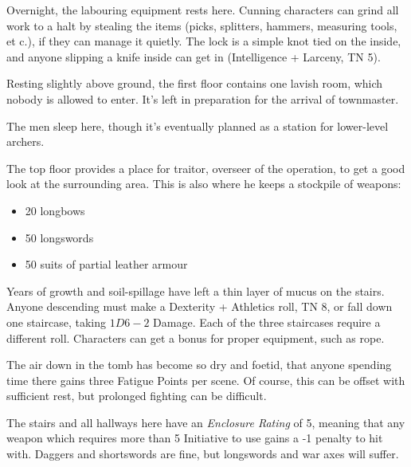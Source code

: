 \begin{multicols}{2}

Overnight, the labouring equipment rests here.  Cunning characters can grind all work to a halt by stealing the items (picks, splitters, hammers, measuring tools, et c.), if they can manage it quietly.  The lock is a simple knot tied on the inside, and anyone slipping a knife inside can get in (Intelligence + Larceny, TN 5).


Resting slightly above ground, the first floor contains one lavish room, which nobody is allowed to enter.  It's left in preparation for the arrival of \gls{townmaster}.


The men sleep here, though it's eventually planned as a station for lower-level archers.


The top floor provides a place for \gls{traitor}, overseer of the operation, to get a good look at the surrounding area.
This is also where he keeps a stockpile of weapons:

\begin{itemize}

	\item{20 longbows}
	\item{50 longswords}
	\item{50 suits of partial leather armour}

\end{itemize}


Years of growth and soil-spillage have left a thin layer of mucus on the stairs.
Anyone descending must make a Dexterity + Athletics roll, TN 8, or fall down one staircase, taking $1D6-2$ Damage.
Each of the three staircases require a different roll.
Characters can get a bonus for proper equipment, such as rope.

The air down in the tomb has become so dry and foetid, that anyone spending time there gains three Fatigue Points per scene.
Of course, this can be offset with sufficient rest, but prolonged fighting can be difficult.

The stairs and all hallways here have an \textit{Enclosure Rating} of 5, meaning that any weapon which requires more than 5 Initiative to use gains a -1 penalty to hit with.
Daggers and shortswords are fine, but longswords and war axes will suffer.



\end{multicols}
